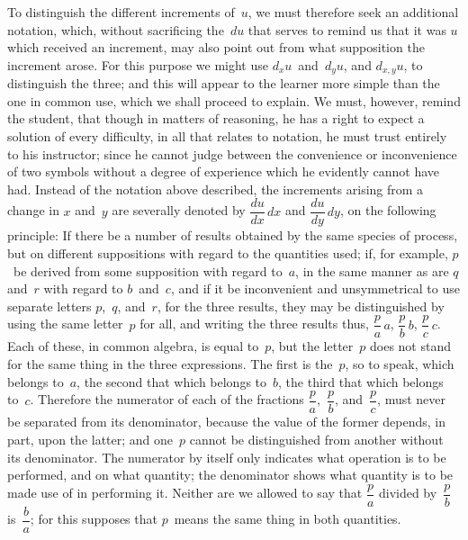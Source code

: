 \documentclass[12pt]{book}[2005/09/16]
\newcommand{\Pagelabel}[1]{\phantomsection\label{page:#1}}
\newcommand{\PageSep}[1]{\Pagelabel{#1}\ignorespaces}
\renewcommand{\(}{{\upshape(}}
\renewcommand{\)}{{\upshape)}}
\begin{document}
To distinguish the different increments of~$u$, we
must therefore seek an additional notation, which,
%
%
without sacrificing the~$du$ that serves to remind us
that it was $u$ which received an increment, may also
point out from what supposition the increment arose.
For this purpose we might use $d_{x}u$~and~$d_{y}u$, and $d_{x,y}u$,
to distinguish the three; and this will appear to the
learner more simple than the one in common use,
which we shall proceed to explain. We must, however,
remind the student, that though in matters of
reasoning, he has a right to expect a solution of every
difficulty, in all that relates to notation, he must trust
entirely to his instructor; since he cannot judge between
the convenience or inconvenience of two symbols
without a degree of experience which he evidently
cannot have had. Instead of the notation above
described, the increments arising from a change in $x$
and~$y$ are severally denoted by $\dfrac{du}{dx}\, dx$ and $\dfrac{du}{dy}\, dy$, on
the following principle: If there be a number of results
obtained by the same species of process, but on
different suppositions with regard to the quantities
\PageSep{80}
used; if, for example, $p$~be derived from some supposition
with regard to~$a$, in the same manner as are $q$
and~$r$ with regard to $b$~and~$c$, and if it be inconvenient
and unsymmetrical to use separate letters $p$,~$q$, and~$r$,
for the three results, they may be distinguished by
using the same letter~$p$ for all, and writing the three
results thus, $\dfrac{p}{a}\, a$, $\dfrac{p}{b}\, b$, $\dfrac{p}{c}\, c$. Each of these, in common
algebra, is equal to~$p$, but the letter~$p$ does not
stand for the same thing in the three expressions.
The first is the~$p$, so to speak, which belongs to~$a$, the
second that which belongs to~$b$, the third that which
belongs to~$c$. Therefore the numerator of each of the
fractions $\dfrac{p}{a}$,~$\dfrac{p}{b}$, and~$\dfrac{p}{c}$, must never be separated
from its denominator, because the value of the former
depends, in part, upon the latter; and one~$p$ cannot
be distinguished from another without its denominator.
The numerator by itself only indicates what operation
is to be performed, and on what quantity; the
denominator shows what quantity is to be made use
of in performing it. Neither are we allowed to say
that $\dfrac{p}{a}$ divided by~$\dfrac{p}{b}$ is~$\dfrac{b}{a}$; for this supposes that $p$~means
the same thing in both quantities.
\end{document}
